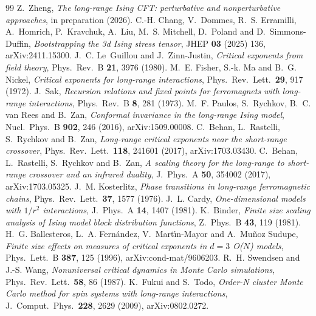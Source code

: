 \documentclass[10pt,a4paper]{article}
\begin{document}
\begin{thebibliography}{99}\small
{} Z.~Zheng, \emph{The long-range Ising CFT: perturbative and nonperturbative approaches}, in preparation (2026).
 C.-H. Chang, V.~Dommes, R.~S. Erramilli, A.~Homrich, P.~Kravchuk, A.~Liu, M.~S. Mitchell, D.~Poland and
 D.~Simmons-Duffin, \emph{Bootstrapping the 3d Ising stress tensor}, JHEP \textbf{03} (2025) 136, arXiv:2411.15300.
 J.~C. Le~Guillou and J.~Zinn-Justin, \emph{Critical exponents from field theory}, Phys.\ Rev.\ B \textbf{21}, 3976 (1980).
 M.~E. Fisher, S.-k. Ma and B.~G. Nickel, \emph{Critical exponents for long-range interactions}, Phys.\ Rev.\ Lett.\ \textbf{29}, 917 (1972).
 J.~Sak, \emph{Recursion relations and fixed points for ferromagnets with long-range interactions}, Phys.\ Rev.\ B \textbf{8}, 281 (1973).
 M.~F. Paulos, S.~Rychkov, B.~C. van Rees and B.~Zan, \emph{Conformal invariance in the long-range Ising model}, Nucl.\ Phys.\ B \textbf{902}, 246 (2016), arXiv:1509.00008.
 C.~Behan, L.~Rastelli, S.~Rychkov and B.~Zan, \emph{Long-range critical exponents near the short-range crossover}, Phys.\ Rev.\ Lett.\ \textbf{118}, 241601 (2017), arXiv:1703.03430.
 C.~Behan, L.~Rastelli, S.~Rychkov and B.~Zan, \emph{A scaling theory for the long-range to short-range crossover and an infrared duality}, J.\ Phys.\ A \textbf{50}, 354002 (2017), arXiv:1703.05325.
 J.~M. Kosterlitz, \emph{Phase transitions in long-range ferromagnetic chains}, Phys.\ Rev.\ Lett.\ \textbf{37}, 1577 (1976).
 J.~L. Cardy, \emph{One-dimensional models with $1/r^2$ interactions}, J.\ Phys.\ A \textbf{14}, 1407 (1981).
 K.~Binder, \emph{Finite size scaling analysis of Ising model block distribution functions}, Z.\ Phys.\ B \textbf{43}, 119 (1981).
 H.~G. Ballesteros, L.~A. Fern\'andez, V.~Mart\'{\i}n-Mayor and A.~Mu\~noz Sudupe, \emph{Finite size effects on measures of critical exponents in $d=3$ O($N$) models}, Phys.\ Lett.\ B \textbf{387}, 125 (1996), arXiv:cond-mat/9606203.
 R.~H. Swendsen and J.-S. Wang, \emph{Nonuniversal critical dynamics in Monte Carlo simulations}, Phys.\ Rev.\ Lett.\ \textbf{58}, 86 (1987).
 K.~Fukui and S.~Todo, \emph{Order-N cluster Monte Carlo method for spin systems with long-range interactions}, J.\ Comput.\ Phys.\ \textbf{228}, 2629 (2009), arXiv:0802.0272.

\end{thebibliography}
\end{document}
